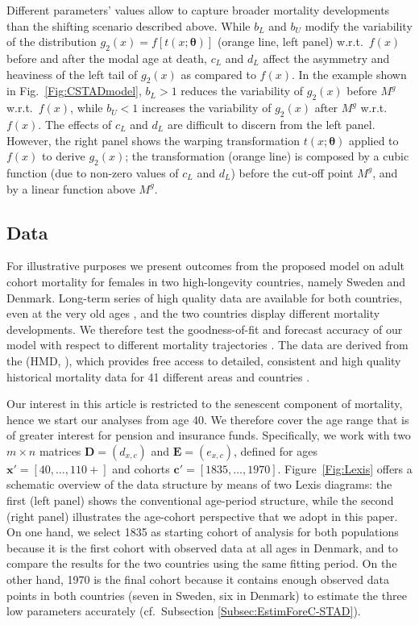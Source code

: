 \documentclass[11pt, a4paper]{article}
\begin{document}
Different parameters' values allow to capture broader mortality developments than the shifting scenario described above. While $b_L$ and $b_U$ modify the variability of the distribution $g_2(x)=f\left[t(x;\bm{\theta})\right]$ (orange line, left panel) w.r.t.~$f(x)$ before and after the modal age at death, $c_L$ and $d_L$ affect the asymmetry and heaviness of the left tail of $g_2(x)$ as compared to $f(x)$. In the example shown in Fig.~\ref{Fig:CSTADmodel}, $b_L > 1$ reduces the variability of $g_2(x)$ before $M^g$ w.r.t.~$f(x)$, while $b_U < 1$ increases the variability of $g_2(x)$ after $M^g$ w.r.t.~$f(x)$. The effects of $c_L$ and $d_L$ are difficult to discern from the left panel. However, the right panel shows the warping transformation $t(x;\bm{\theta})$ applied to $f(x)$ to derive $g_2(x)$; the transformation (orange line) is composed by a cubic function (due to non-zero values of $c_L$ and $d_L$) before the cut-off point $M^g$, and by a linear function above $M^g$.

\subsection{Data}
\label{Subsec:Data}
For illustrative purposes we present outcomes from the proposed model on adult cohort mortality for females in two high-longevity countries, namely Sweden and Denmark. Long-term series of high quality data are available for both countries, even at the very old ages \citep{vaupel1994longer,wilmoth1996extreme,AndreevBookDanemark}, and the two countries display different mortality developments. We therefore test the goodness-of-fit and forecast accuracy of our model with respect to different mortality trajectories \citep{ChristensenEtAlDenmarkSwedenDivergence2010}. The data are derived from the \citeauthor{HMD} (HMD, \citeyear{HMD}), which provides free access to detailed, consistent and high quality historical mortality data for 41 different areas and countries \citep{barbieri2015data}.

Our interest in this article is restricted to the senescent component of mortality, hence we start our analyses from age 40. We therefore cover the age range that is of greater interest for pension and insurance funds. Specifically, {\color{red} we work with two} $m \times n$ matrices $\bm{D} = (d_{x,c})$ and $\bm{E} = (e_{x,c})$, {\color{red} defined for ages $\bm{x}'=\left[40,\dots,110+\right]$ and cohorts $\bm{c}'=\left[1835,\dots,1970\right]$}. Figure~\ref{Fig:Lexis} offers a schematic overview of the data structure by means of two Lexis diagrams: the first (left panel) shows the conventional age-period structure, while the second (right panel) illustrates the age-cohort perspective that we adopt in this paper. On one hand, we select 1835 as starting cohort of analysis for both populations because it is the first cohort with observed data at all ages in Denmark, and to compare the results for the two countries using the same fitting period. On the other hand, 1970 is the final cohort because it contains enough observed data points in both countries (seven in Sweden, six in Denmark) to estimate the three low parameters accurately (cf.~Subsection \ref{Subsec:EstimForeC-STAD}). 
\end{document}
